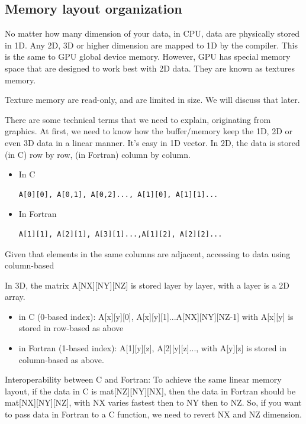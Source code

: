 \subsection{Memory layout organization}
\label{sec:memory-layo-organ}


\begin{framed}
  No matter how many dimension of your data, in CPU, data are
  physically stored in 1D. Any 2D, 3D or higher dimension are mapped
  to 1D by the compiler. This is the same to GPU global device
  memory. However, GPU has special memory space that are designed to
  work best with 2D data. They are known as textures memory. 
  
  Texture memory are read-only, and are limited in size. We will
  discuss that later. 
\end{framed}

There are some technical terms that we need to explain, originating
from graphics. At first, we need to know how the buffer/memory keep
the 1D, 2D or even 3D data in a linear manner. It's easy in 1D
vector. In 2D, the data is stored (in C) row by row, (in Fortran)
column by column. 
\begin{itemize}
\item In C
\begin{verbatim}
A[0][0], A[0,1], A[0,2]..., A[1][0], A[1][1]...
\end{verbatim}
\item In Fortran
\begin{verbatim}
A[1][1], A[2][1], A[3][1]...,A[1][2], A[2][2]...
\end{verbatim}
\end{itemize}
Given that elements in the same columns are adjacent, accessing to
data using column-based 

In 3D, the matrix A[NX][NY][NZ] is stored layer by layer, with a layer
is a 2D array.
\begin{itemize}
\item in C (0-based index): A[x][y][0], A[x][y][1]...A[NX][NY][NZ-1]
  with A[x][y] is stored in row-based as above

\item in Fortran (1-based index): A[1][y][z], A[2][y][z]..., with
  A[y][z] is stored in column-based as above. 
\end{itemize}

\begin{framed}
  Interoperability between C and Fortran: To achieve the same linear
  memory layout, if the data in C is mat[NZ][NY][NX], then the data in
  Fortran should be mat[NX][NY][NZ], with NX varies fastest then to NY
  then to NZ. So, if you want to pass data in Fortran to a C function,
  we need to revert NX and NZ dimension. 
\end{framed}

